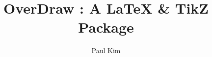 \documentclass[10pt,a4paper]{article}
\begin{document}
\begin{titlepage}
    \title{OverDraw : A \LaTeX{} \& TikZ Package}
    \author{Paul Kim}
    \date{}
\maketitle
\end{titlepage}
\tableofcontents
\newpage
\end{document}
